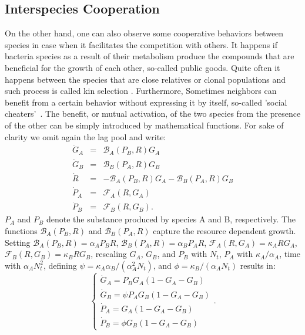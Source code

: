 \documentclass[10pt,A4paper]{article}
\begin{document}
\subsection{Interspecies Cooperation}
On the other hand, one can also observe some cooperative behaviors between species in case when it facilitates the competition with others.
It happens if bacteria species as a result of their metabolism produce the compounds that are beneficial for the growth of each other, so-called public goods.
Quite often it happens between the species that are close relatives or clonal populations and such process is called kin selection \cite{west_social_2007}.
Furthermore, Sometimes neighbors can benefit from a certain behavior without expressing it by itself, so-called 'social cheaters'~\cite{rainey_evolution_2003}.
%
%
The benefit, or mutual activation, of the two species from the presence of the other can be simply introduced by mathematical functions.
For sake of clarity we omit again the lag pool and write:
\begin{eqnarray}
    \dot{G}_A &=& \mathcal{B}_A(P_B,R)G_A\\
    \dot{G}_B &=& \mathcal{B}_B(P_A,R)G_B\\
    \dot{R} &=&-\mathcal{B}_A(P_B,R)G_A-\mathcal{B}_B(P_A,R)G_B\\
    \dot{P}_A &=& \mathcal{F}_A(R,G_A)\\
    \dot{P}_B &=& \mathcal{F}_B(R,G_B).
\end{eqnarray}
$P_A$ and $P_B$ denote the substance produced by species A and B, respectively.
The functions $\mathcal{B}_A(P_B,R)$ and $\mathcal{B}_B(P_A,R)$ capture the resource dependent growth.
Setting $\mathcal{B}_A(P_B,R)=\alpha_A P_BR$, $\mathcal{B}_B(P_A,R)=\alpha_B P_A R$, $\mathcal{F}_A(R,G_A)=\kappa_A RG_A$, $\mathcal{F}_B(R,G_B)=\kappa_B RG_B$, rescaling $G_A$, $G_B$, and $P_B$ with $N_t$, $P_A$ with $\kappa_A/\alpha_A$, time with $\alpha_AN_t^2$, defining $\psi=\kappa_A\alpha_B/(\alpha_A^2N_t)$, and $\phi=\kappa_B/(\alpha_A N_t)$ results in:
\begin{equation}
    \begin{cases}
    \dot{G}_A = P_B G_A\left(1 - G_A-G_B\right)\\
    \dot{G}_B = \psi P_A G_B\left(1 - G_A-G_B\right)\\
    \dot{P}_A = G_A\left(1 - G_A-G_B\right)\\
    \dot{P}_B =\phi G_B\left(1 - G_A-G_B\right)
    \end{cases}.
    \label{eq:1pool_2sp_cooper}
\end{equation}
\end{document}
